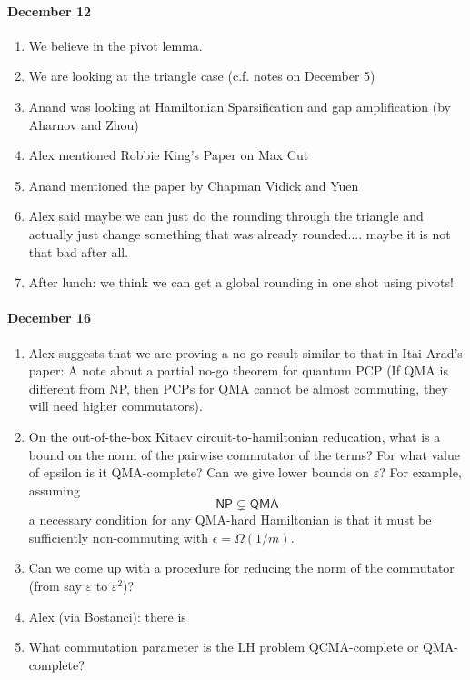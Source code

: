 \documentclass[11pt]{article}
\theoremstyle{plain}
\newcommand{\eps}{\varepsilon}
\begin{document}
\paragraph{December 12}
\begin{enumerate}
    \item We believe in the pivot lemma.
    \item We are looking at the triangle case (c.f. notes on December 5)
    \item Anand was looking at Hamiltonian Sparsification and gap amplification (by Aharnov and Zhou)
    \item Alex mentioned Robbie King's Paper on Max Cut
    \item Anand mentioned the paper by Chapman Vidick and Yuen
    \item Alex said maybe we can just do the rounding through the triangle and actually just change something that was already rounded.... maybe it is not that bad after all.
    \item After lunch: we think we can get a global rounding in one shot using pivots! 
\end{enumerate}

\paragraph{December 16}
\begin{enumerate}
    \item Alex suggests that we are proving a no-go result similar to that in Itai Arad's paper: A note about a partial no-go theorem for quantum PCP (If QMA is different from NP, then PCPs for QMA cannot be almost commuting, they will need higher commutators).
    \item On the out-of-the-box Kitaev circuit-to-hamiltonian reducation, what is a bound on the norm of the pairwise commutator of the terms? For what value of epsilon is it QMA-complete? Can we give lower bounds on $\eps$? For example, assuming $$\mathsf{NP} \subsetneq \mathsf{QMA}$$ a necessary condition for any QMA-hard Hamiltonian is that it must be sufficiently non-commuting with $\epsilon = \Omega(1/m)$.
    \item Can we come up with a procedure for reducing the norm of the commutator (from say $\eps$ to $\eps^2$)?
    \item Alex (via Bostanci): there is 
    \item What commutation parameter is the LH problem QCMA-complete or QMA-complete?
\end{enumerate}
\end{document}
